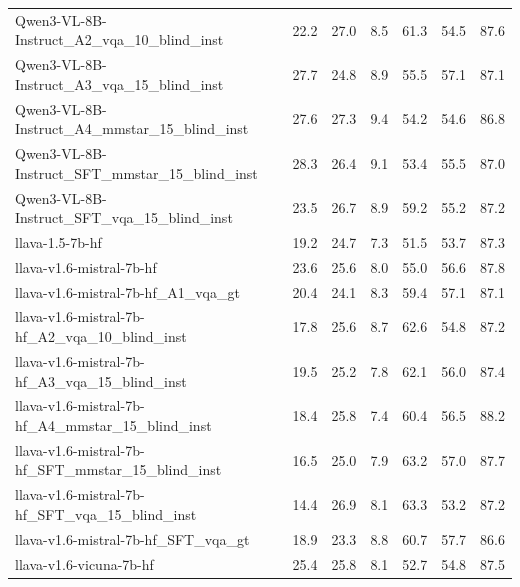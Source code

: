 \begin{tabular}{lrrrrrr}
Qwen3-VL-8B-Instruct_A2_vqa_10_blind_inst & 22.2 & 27.0 & 8.5 & 61.3 & 54.5 & 87.6 \\
Qwen3-VL-8B-Instruct_A3_vqa_15_blind_inst & 27.7 & 24.8 & 8.9 & 55.5 & 57.1 & 87.1 \\
Qwen3-VL-8B-Instruct_A4_mmstar_15_blind_inst & 27.6 & 27.3 & 9.4 & 54.2 & 54.6 & 86.8 \\
Qwen3-VL-8B-Instruct_SFT_mmstar_15_blind_inst & 28.3 & 26.4 & 9.1 & 53.4 & 55.5 & 87.0 \\
Qwen3-VL-8B-Instruct_SFT_vqa_15_blind_inst & 23.5 & 26.7 & 8.9 & 59.2 & 55.2 & 87.2 \\
llava-1.5-7b-hf & 19.2 & 24.7 & 7.3 & 51.5 & 53.7 & 87.3 \\
llava-v1.6-mistral-7b-hf & 23.6 & 25.6 & 8.0 & 55.0 & 56.6 & 87.8 \\
llava-v1.6-mistral-7b-hf_A1_vqa_gt & 20.4 & 24.1 & 8.3 & 59.4 & 57.1 & 87.1 \\
llava-v1.6-mistral-7b-hf_A2_vqa_10_blind_inst & 17.8 & 25.6 & 8.7 & 62.6 & 54.8 & 87.2 \\
llava-v1.6-mistral-7b-hf_A3_vqa_15_blind_inst & 19.5 & 25.2 & 7.8 & 62.1 & 56.0 & 87.4 \\
llava-v1.6-mistral-7b-hf_A4_mmstar_15_blind_inst & 18.4 & 25.8 & 7.4 & 60.4 & 56.5 & 88.2 \\
llava-v1.6-mistral-7b-hf_SFT_mmstar_15_blind_inst & 16.5 & 25.0 & 7.9 & 63.2 & 57.0 & 87.7 \\
llava-v1.6-mistral-7b-hf_SFT_vqa_15_blind_inst & 14.4 & 26.9 & 8.1 & 63.3 & 53.2 & 87.2 \\
llava-v1.6-mistral-7b-hf_SFT_vqa_gt & 18.9 & 23.3 & 8.8 & 60.7 & 57.7 & 86.6 \\
llava-v1.6-vicuna-7b-hf & 25.4 & 25.8 & 8.1 & 52.7 & 54.8 & 87.5 \\
\bottomrule
\end{tabular}
